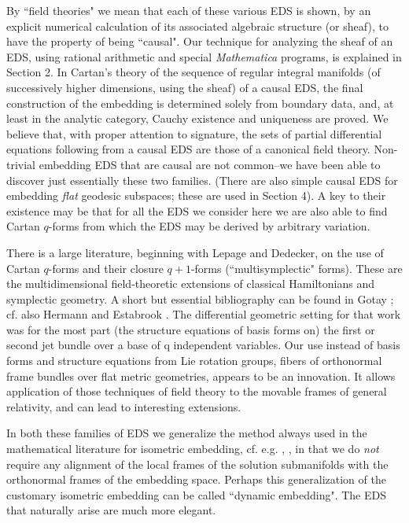 \documentclass[a4paper,a4paper]{article}
\begin{document}
        By ``field theories" we mean that each of these various EDS is
shown,  by an explicit numerical calculation of its associated algebraic
structure (or sheaf),  to have the property of being ``causal".  Our technique for
analyzing the sheaf of an EDS,  using rational arithmetic and special
{\itshape Mathematica} programs,  is explained in Section 2.  In Cartan's theory of the
sequence of regular integral manifolds (of successively higher
dimensions,  using the sheaf) of a causal EDS,  the final construction of the embedding is
determined solely from boundary data,  and,  at least in the analytic
category, Cauchy existence and uniqueness are proved.  We believe that,  with
proper attention to signature,  the sets of partial differential
equations following from a causal EDS are those of a canonical field theory.  Non-trivial
embedding EDS that are causal are not common--we have been able to
discover just essentially these two families.  (There are also simple causal EDS
for embedding {\itshape flat} geodesic subspaces;  these are used in
Section 4).  A key to their existence may be that for all the EDS we consider
here we are also able to find Cartan $q$-forms from which the EDS may be
derived by arbitrary variation.

        There is a large literature,  beginning with Lepage and
Dedecker,  on the use of Cartan $q$-forms and their closure $q + 1$-forms
(``multisymplectic" forms).  These are the multidimensional field-theoretic extensions of
classical Hamiltonians and symplectic geometry.  A short but essential
bibliography can be found in Gotay \cite{got91};  cf. also Hermann \cite{her88} and
Estabrook \cite{est80}.  The differential geometric setting for that
work was for the most part (the structure equations of basis forms on) the first or second jet bundle
over a base of q independent variables.  Our use instead of basis forms
and structure equations from Lie rotation groups,  fibers of orthonormal
frame bundles over flat metric geometries,  appears to be an
innovation.  It allows application of those techniques of field theory to the movable frames of
general relativity,  and can lead to interesting extensions.

        In both these families of EDS we  generalize the method always
used in the mathematical literature for isometric embedding,  cf. e.g.
\cite{bry83},  \cite{gri87}, in that we do {\itshape not} require any alignment of the local frames
of the solution submanifolds with the orthonormal frames of the
embedding space.  Perhaps this generalization of the customary isometric
embedding  can be called ``dynamic embedding".  The EDS that naturally
arise are much more elegant.
\end{document}
